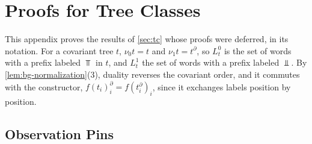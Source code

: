 
\section{Proofs for Tree Classes}\label{app:tc}\label{app:classes}

This appendix proves the results of \cref{sec:tc} whose proofs were
deferred, in its notation. For a covariant tree $t$, $\nu_0t=t$ and
$\nu_1t=t^\partial$, so $L^0_t$ is the set of words with a prefix labeled
$\Top$ in $t$, and $L^1_t$ the set of words with a prefix labeled $\Bot$. By
\cref{lem:bg-normalization}(3), duality reverses the covariant order, and it
commutes with the constructor, $f(t_i)_i^\partial=f(t_i^\partial)_i$, since it
exchanges labels position by position.

\subsection{Observation Pins}\label{app:tc-pins}

